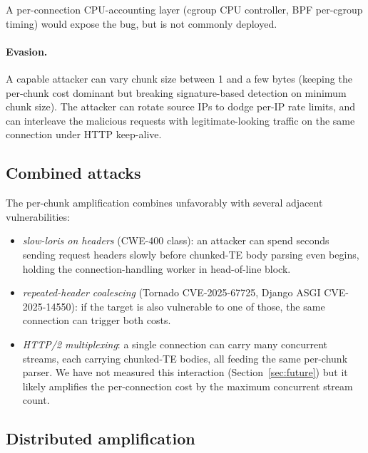 A per-connection CPU-accounting layer (cgroup CPU controller, BPF
per-cgroup timing) would expose the bug, but is not commonly
deployed.

\paragraph{Evasion.}
A capable attacker can vary chunk size between 1 and a few bytes
(keeping the per-chunk cost dominant but breaking signature-based
detection on minimum chunk size). The attacker can rotate source
IPs to dodge per-IP rate limits, and can interleave the malicious
requests with legitimate-looking traffic on the same connection
under HTTP keep-alive.

\subsection{Combined attacks}
\label{sec:tm-combined}

The per-chunk amplification combines unfavorably with several
adjacent vulnerabilities:

\begin{itemize}
  \item \emph{slow-loris on headers} (CWE-400 class): an attacker
    can spend
    seconds sending request headers slowly before chunked-TE body
    parsing even begins, holding the connection-handling worker
    in head-of-line block.
  \item \emph{repeated-header coalescing} (Tornado
    CVE-2025-67725, Django ASGI CVE-2025-14550): if the target
    is also vulnerable to one of those, the same connection
    can trigger both costs.
  \item \emph{HTTP/2 multiplexing}: a single connection can carry
    many concurrent streams, each carrying chunked-TE bodies, all
    feeding the same per-chunk parser. We have not measured this
    interaction (Section~\ref{sec:future}) but it likely amplifies
    the per-connection cost by the maximum concurrent stream
    count.
\end{itemize}

\subsection{Distributed amplification}
\label{sec:tm-distributed}

